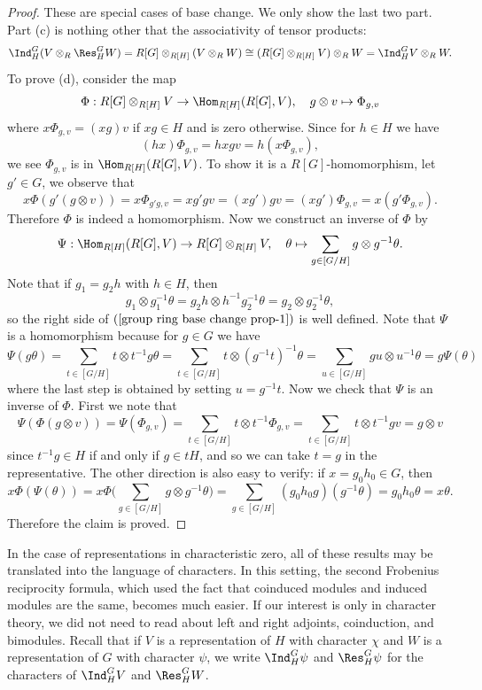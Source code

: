 \begin{proof}
These are special cases of base change. We only show the last two part. Part (c) is nothing other that the associativity of tensor products:
\[\Ind^G_{H}(V\otimes_R\Res^G_HW)=R[G]\otimes_{R[H]}(V\otimes_RW)\cong (R[G]\otimes_{R[H]}V)\otimes_RW=\Ind^G_HV\otimes_RW.\]
To prove (d), consider the map
\[\Phi:R[G]\otimes_{R[H]}V\to\Hom_{R[H]}(R[G],V),\quad g\otimes v\mapsto\Phi_{g,v}\]
where $x\Phi_{g,v}=(xg)v$ if $xg\in H$ and is zero otherwise. Since for $h\in H$ we have
\[(hx)\Phi_{g,v}=hxgv=h(x\Phi_{g,v}),\]
we see $\Phi_{g,v}$ is in $\Hom_{R[H]}(R[G],V)$. To show it is a $R[G]$-homomorphism, let $g'\in G$, we observe that
\[x\Phi(g'(g\otimes v))=x\Phi_{g'g,v}=xg'gv=(xg')gv=(xg')\Phi_{g,v}=x(g'\Phi_{g,v}).\]
Therefore $\Phi$ is indeed a homomorphism. Now we construct an inverse of $\Phi$ by
\begin{align}\label{group ring base change prop-1}
\Psi:\Hom_{R[H]}(R[G],V)\to R[G]\otimes_{R[H]}V,\quad\theta\mapsto\sum_{g\in[G/H]}g\otimes g^{-1}\theta.
\end{align}
Note that if $g_1=g_2h$ with $h\in H$, then
\[g_1\otimes g_1^{-1}\theta=g_2h\otimes h^{-1}g_2^{-1}\theta=g_2\otimes g_2^{-1}\theta,\]
so the right side of $(\ref{group ring base change prop-1})$ is well defined. Note that $\Psi$ is a homomorphism because for $g\in G$ we have
\[\Psi(g\theta)=\sum_{t\in[G/H]}t\otimes t^{-1}g\theta=\sum_{t\in[G/H]}t\otimes(g^{-1}t)^{-1}\theta=\sum_{u\in[G/H]}gu\otimes u^{-1}\theta=g\Psi(\theta)\]
where the last step is obtained by setting $u=g^{-1}t$. Now we check that $\Psi$ is an inverse of $\Phi$. First we note that
\[\Psi(\Phi(g\otimes v))=\Psi(\Phi_{g,v})=\sum_{t\in[G/H]}t\otimes t^{-1}\Phi_{g,v}=\sum_{t\in[G/H]}t\otimes t^{-1}gv=g\otimes v\]
since $t^{-1}g\in H$ if and only if $g\in tH$, and so we can take $t=g$ in the representative. The other direction is also easy to verify: if $x=g_0h_0\in G$, then
\[x\Phi(\Psi(\theta))=x\Phi\Big(\sum_{g\in[G/H]}g\otimes g^{-1}\theta\Big)=\sum_{g\in[G/H]}(g_0h_0g)(g^{-1}\theta)=g_0h_0\theta=x\theta.\]
Therefore the claim is proved.
\end{proof}
In the case of representations in characteristic zero, all of these results may be translated into the language of characters. In this setting, the second Frobenius reciprocity formula, which used the fact that coinduced modules and induced modules are the same, becomes much easier. If our interest is only in character theory, we did not need to read about left and right adjoints, coinduction, and bimodules. Recall that if $V$ is a representation of $H$ with character $\chi$ and $W$ is a representation of $G$ with character $\psi$, we write $\Ind^G_H\psi$ and $\Res^G_H\psi$ for the characters of $\Ind^G_HV$ and $\Res^G_HW$.
